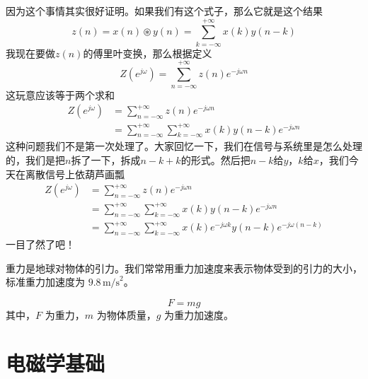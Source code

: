 \documentclass[a4paper,12pt]{article}
\begin{document}
因为这个事情其实很好证明。如果我们有这个式子，那么它就是这个结果
\begin{equation}
   z(n) = x(n)\circledast y(n)=\sum_{k=-\infty}^{+\infty}x(k)y(n-k)
\end{equation}
我现在要做$z(n)$的傅里叶变换，那么根据定义
\begin{equation}
   Z\left (e^{j\omega}\right ) = \sum_{n=-\infty}^{+\infty}z(n)e^{-j\omega n}
\end{equation}
这玩意应该等于两个求和
\begin{equation}
\begin{aligned}
   Z\left (e^{j\omega}\right ) &= \sum_{n=-\infty}^{+\infty}z(n)e^{-j\omega n}\\
&=\sum_{n=-\infty}^{+\infty}\sum_{k=-\infty}^{+\infty}x(k)y(n-k)e^{-j\omega n}
\end{aligned}
\end{equation}
这种问题我们不是第一次处理了。大家回忆一下，我们在信号与系统里是怎么处理的，我们是把$n$拆了一下，拆成$n-k+k$的形式。然后把$n-k$给$y$，$k$给$x$，我们今天在离散信号上依葫芦画瓢
\begin{equation}
\begin{aligned}
   Z\left (e^{j\omega}\right ) &= \sum_{n=-\infty}^{+\infty}z(n)e^{-j\omega n}\\
&=\sum_{n=-\infty}^{+\infty}\sum_{k=-\infty}^{+\infty}x(k)y(n-k)e^{-j\omega n}\\
&=\sum_{n=-\infty}^{+\infty}\sum_{k=-\infty}^{+\infty}x(k)e^{-j\omega k}y(n-k)e^{-j\omega \left( n-k\right )}
\end{aligned}
\end{equation}
一目了然了吧！












重力是地球对物体的引力。我们常常用重力加速度来表示物体受到的引力的大小，标准重力加速度为 $9.8 \, \text{m/s}^2$。

\begin{equation}
    F = mg
\end{equation}
其中，$F$ 为重力，$m$ 为物体质量，$g$ 为重力加速度。




\newpage

\section{电磁学基础}
\end{document}
